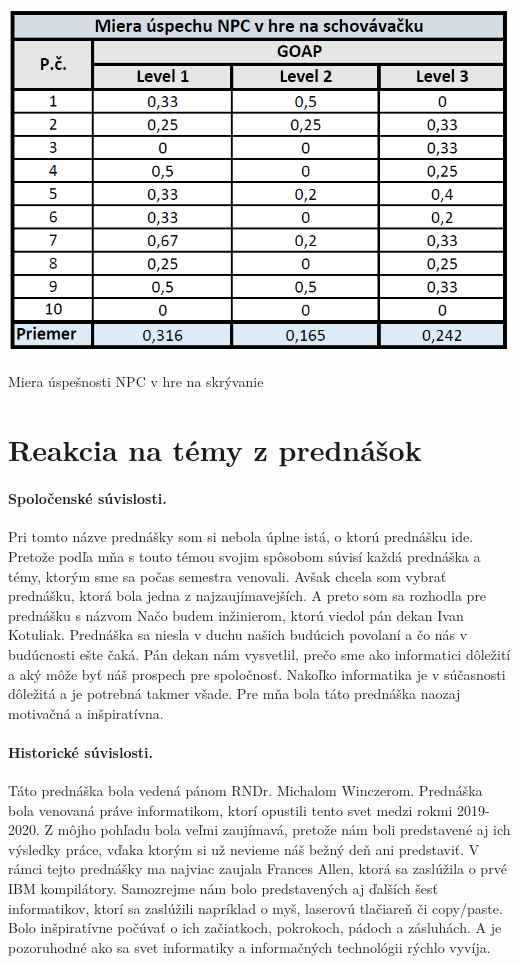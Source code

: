 \documentclass[10pt,twoside,slovak,a4paper]{article}
\begin{document}
\begin{table}[tbh]
\center \includegraphics[scale=0.41]{priklad.png}
\caption{Miera úspešnosti NPC v hre na skrývanie}
\label{t:t2}
\end{table}



\section{Reakcia na témy z prednášok} 
\paragraph{Spoločenské súvislosti.}Pri tomto názve prednášky som si nebola úplne istá, o ktorú prednášku ide. Pretože podľa mňa s touto témou svojim spôsobom súvisí každá prednáška a témy, ktorým sme sa počas semestra venovali. Avšak chcela som vybrať prednášku, ktorá bola jedna z najzaujímavejších. A preto som sa rozhodla pre prednášku s názvom Načo budem inžinierom, ktorú viedol pán dekan Ivan Kotuliak. Prednáška sa niesla v duchu našich budúcich povolaní a čo nás v budúcnosti ešte čaká. Pán dekan nám vysvetlil, prečo sme ako informatici dôležití a aký môže byť náš prospech pre spoločnosť. Nakoľko informatika je v súčasnosti dôležitá a je potrebná takmer všade. Pre mňa bola táto prednáška naozaj motivačná a inšpiratívna. 


\paragraph{Historické súvislosti.}Táto prednáška bola vedená pánom RNDr. Michalom Winczerom. Prednáška bola venovaná práve informatikom, ktorí opustili tento svet medzi rokmi 2019-2020. Z môjho pohľadu bola veľmi zaujímavá, pretože nám boli predstavené aj ich výsledky práce, vďaka ktorým si už nevieme náš bežný deň ani predstaviť. V rámci tejto prednášky ma najviac zaujala Frances Allen, ktorá sa zaslúžila o prvé IBM kompilátory. Samozrejme nám bolo predstavených aj ďalších šesť informatikov, ktorí sa zaslúžili napríklad o myš, laserovú tlačiareň či copy/paste. Bolo inšpiratívne počúvať o
ich začiatkoch, pokrokoch, pádoch a zásluhách. A je pozoruhodné ako sa svet informatiky a informačných technológii rýchlo vyvíja. 
\end{document}
